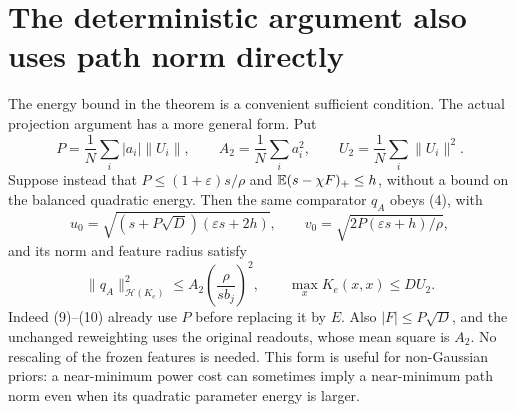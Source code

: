 \section{The deterministic argument also uses path norm directly}
The energy bound in the theorem is a convenient sufficient condition.
The actual projection argument has a more general form. Put
\[
 P=\frac1N\sum_i|a_i|\|U_i\|,\qquad
 A_2=\frac1N\sum_i a_i^2,\qquad U_2=\frac1N\sum_i\|U_i\|^2.
\]
Suppose instead that $P\le(1+\varepsilon)s/\rho$ and
$\mathbb E(s-\chi F)_+\le h$, without a bound on the balanced quadratic energy.
Then the same comparator $q_A$ obeys (4), with
\[
 u_0=\sqrt{(s+P\sqrt D)(\varepsilon s+2h)},\qquad
 v_0=\sqrt{2P(\varepsilon s+h)/\rho},
\]
and its norm and feature radius satisfy
\[
 \|q_A\|_{\mathcal H(K_e)}^2
       \le A_2\left(\frac{\rho}{s b_j}\right)^2,
 \qquad \max_xK_e(x,x)\le D U_2.                    \tag{11a}
\]
Indeed (9)--(10) already use $P$ before replacing it by $E$.
Also $|F|\le P\sqrt D$, and the unchanged reweighting uses the original
readouts, whose mean square is $A_2$. No rescaling of the frozen features
is needed. This form is useful for non-Gaussian priors: a near-minimum
power cost can sometimes imply a near-minimum path norm even when its
quadratic parameter energy is larger.
